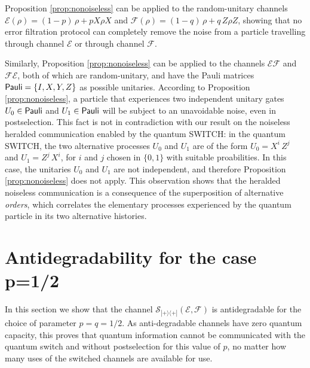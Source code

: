 \documentclass[aps,prl,twocolumn,superscriptaddress,groupedaddress]{revtex4}
\def\>{\rangle}
\def\<{\langle}
\newcommand{\map}[1]{\mathcal{#1}}
\begin{document}
\medskip  
Proposition \ref{prop:nonoiseless} can be applied to the  random-unitary channels $\map E   (\rho)  =  (1-p)\,   \rho  +  p  X  \rho X$ and $\map F  (\rho)  =  (1-q) \,  \rho   + q \,  Z\rho Z$, showing that no error filtration protocol can completely remove the noise from a particle travelling through channel $\map E$ or through channel $\map F$. 


Similarly, Proposition \ref{prop:nonoiseless} can be applied to the channels $\map E  \map F$ and $\map F \map E$, both of which are random-unitary, and have the Pauli matrices  ${\sf Pauli}   =  \{  I, X, Y, Z\}$ as possible unitaries.    According to Proposition \ref{prop:nonoiseless}, a particle that experiences two independent unitary gates $U_0  \in {\sf Pauli}$ and $U_1  \in {\sf Pauli}$ will be subject to an unavoidable noise, even in postselection. 
This fact is not in contradiction with our result on the noiseless heralded communication enabled by the quantum SWITCH: in the quantum SWITCH,   the two alternative processes $U_0$ and $U_1$ are of the form $U_0  =   X^i  \, Z^j$ and $U_1  =  Z^j  \,  X^i $, for $i$ and $j$ chosen  in $\{0,1\}$ with suitable proabilities.  In this case, the unitaries $U_0$ and $U_1$ are not independent, and therefore Proposition \ref{prop:nonoiseless} does not apply.   This observation shows that the heralded noiseless communication is a consequence of the superposition of alternative {\em orders}, which correlates the  elementary processes experienced  by the quantum particle in its two alternative histories. 

\iffalse
\section{Antidegradability for the case p=1/2}
In this section we show that the channel $\map S_{|+\>\<+|}(\map E, \map F)$ is antidegradable for the choice of parameter $p=q=1/2$. As anti-degradable channels have zero quantum capacity, this proves that quantum information cannot be communicated with the quantum switch and without postselection for this value of $p$, no matter how many uses of the switched channels are available for use.
\end{document}
